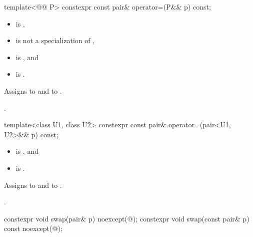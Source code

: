 %
\begin{itemdecl}
template<@@ P> constexpr const pair& operator=(P&& p) const;
\end{itemdecl}

\begin{itemdescr}
\pnum
\constraints
\begin{itemize}
\item
{}
is ,
\item
{} is not a specialization of ,
\item
{}
is , and
\item
{}
is .
\end{itemize}

\pnum
\effects
Assigns  to  and
 to .

\pnum
\returns
{}.
\end{itemdescr}

%
\begin{itemdecl}
template<class U1, class U2> constexpr const pair& operator=(pair<U1, U2>&& p) const;
\end{itemdecl}

\begin{itemdescr}
\pnum
\constraints
\begin{itemize}
\item
{} is , and
\item
{} is .
\end{itemize}

\pnum
\effects
Assigns  to  and
 to .

\pnum
\returns
{}.
\end{itemdescr}

%
\begin{itemdecl}
constexpr void swap(pair& p) noexcept(@\seebelow@);
constexpr void swap(const pair& p) const noexcept(@\seebelow@);
\end{itemdecl}

